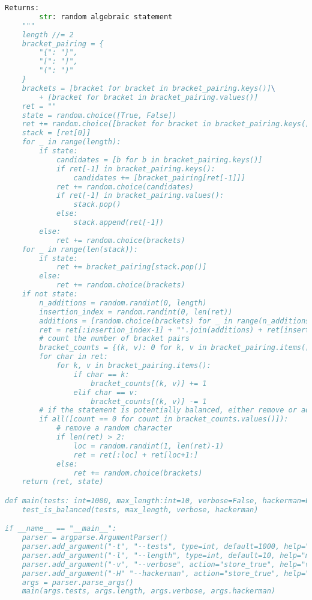 \documentclass{report}
\begin{document}
\begin{lstlisting}[language=python]
    Returns:
        str: random algebraic statement
    """
    length //= 2
    bracket_pairing = {
        "{": "}",
        "[": "]",
        "(": ")"
    }
    brackets = [bracket for bracket in bracket_pairing.keys()]\
        + [bracket for bracket in bracket_pairing.values()]
    ret = ""
    state = random.choice([True, False])
    ret += random.choice([bracket for bracket in bracket_pairing.keys()])
    stack = [ret[0]]
    for _ in range(length):
        if state:
            candidates = [b for b in bracket_pairing.keys()]
            if ret[-1] in bracket_pairing.keys():
                candidates += [bracket_pairing[ret[-1]]]
            ret += random.choice(candidates)
            if ret[-1] in bracket_pairing.values():
                stack.pop()
            else:
                stack.append(ret[-1])
        else:
            ret += random.choice(brackets)
    for _ in range(len(stack)):
        if state:
            ret += bracket_pairing[stack.pop()]
        else:
            ret += random.choice(brackets)
    if not state:
        n_additions = random.randint(0, length)
        insertion_index = random.randint(0, len(ret))
        additions = [random.choice(brackets) for _ in range(n_additions)]
        ret = ret[:insertion_index-1] + "".join(additions) + ret[insertion_index+1:len(ret)+1-n_additions]
        # count the number of bracket pairs
        bracket_counts = {(k, v): 0 for k, v in bracket_pairing.items()}
        for char in ret:
            for k, v in bracket_pairing.items():
                if char == k:
                    bracket_counts[(k, v)] += 1
                elif char == v:
                    bracket_counts[(k, v)] -= 1
        # if the statement is potentially balanced, either remove or add a random character.
        if all([count == 0 for count in bracket_counts.values()]):
            # remove a random character
            if len(ret) > 2:
                loc = random.randint(1, len(ret)-1)
                ret = ret[:loc] + ret[loc+1:]
            else:
                ret += random.choice(brackets)
    return (ret, state)

def main(tests: int=1000, max_length:int=10, verbose=False, hackerman=False):
    test_is_balanced(tests, max_length, verbose, hackerman)

if __name__ == "__main__":
    parser = argparse.ArgumentParser()
    parser.add_argument("-t", "--tests", type=int, default=1000, help="number of tests to run")
    parser.add_argument("-l", "--length", type=int, default=10, help="maximum length of the statement")
    parser.add_argument("-v", "--verbose", action="store_true", help="verbose output")
    parser.add_argument("-H" "--hackerman", action="store_true", help="hackerman mode", dest="hackerman")
    args = parser.parse_args()
    main(args.tests, args.length, args.verbose, args.hackerman)
\end{lstlisting}
\end{document}
